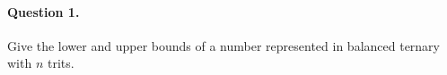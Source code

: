 \paragraph{Question 1.} Give the lower and upper bounds of a number
represented in balanced ternary with \(n\) trits.

